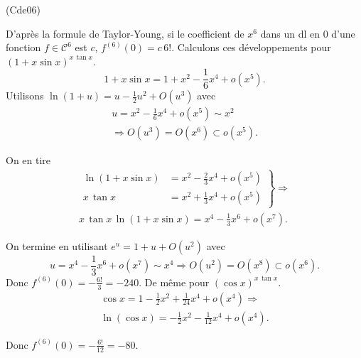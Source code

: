\begin{tiny}(Cde06)\end{tiny} D'après la formule de Taylor-Young, si le coefficient de $x^6$ dans un dl en $0$ d'une fonction $f \in \mathcal{C}^6$ est $c$,
$f^{(6)}(0) = c \, 6!$.\newline
Calculons ces développements pour $(1+x\sin x) ^{x\, \tan x}$.
\[
  1 + x \sin x = 1 + x^2 - \frac{1}{6}x^4 + o(x^5).
\]
Utilisons $\ln(1+u) = u - \frac{1}{2}u^2 + O(u^3)$ avec
\begin{multline*}
  u = x^2 - \frac{1}{6}x^4 + o(x^5) \sim x^2 \\
  \Rightarrow O(u^3) = O(x^6) \subset o(x^5).
\end{multline*}

On en tire
\begin{multline*}
\left.
\begin{aligned}
  \ln(1 + x\sin x) &= x^2 - \frac{2}{3}x^4 + o(x^5) \\
  x\,\tan x &= x^2 + \frac{1}{3}x^4 + o(x^5)
\end{aligned} \right\rbrace 
\Rightarrow \\
x\,\tan x\, \ln(1 + x\sin x)
= x^4 - \frac{1}{3}x^6 + o(x^7).
\end{multline*}

On termine en utilisant $e^u = 1 + u + O(u^2)$ avec 
\[
  u = x^4 - \frac{1}{3}x^6 + o(x^7) \sim x^4 
  \Rightarrow O(u^2) = O(x^8) \subset o(x^6).
\]
Donc $f^{(6)}(0) = -\frac{6!}{3} = -240$.\newline
De même pour $(\cos x) ^{x\, \tan x}$.
\begin{multline*}
  \cos x = 1 - \frac{1}{2}x^2 + \frac{1}{24}x^4 + o(x^4) \Rightarrow \\
  \ln(\cos x) = - \frac{1}{2}x^2 - \frac{1}{12}x^4 + o(x^4).
\end{multline*}

Donc $f^{(6)}(0) = -\frac{6!}{12} = -80$.
